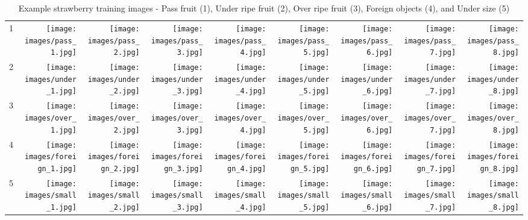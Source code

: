 \documentclass[fleqn,twoside,12pt]{report}
\begin{document}
\begin{table}[h]
	\centering
	\caption{Example strawberry training images - Pass fruit (1), Under ripe fruit (2), Over ripe fruit (3), Foreign objects (4), and Under size (5)}
	\label{tab:training_samples}
	\begin{tabular}{c*8{N}}
		
		1 &
		\texttt{[image: images/pass\_1.jpg]} & \texttt{[image: images/pass\_2.jpg]} & \texttt{[image: images/pass\_3.jpg]} &         \texttt{[image: images/pass\_4.jpg]} & \texttt{[image: images/pass\_5.jpg]} &         \texttt{[image: images/pass\_6.jpg]} & \texttt{[image: images/pass\_7.jpg]} &         \texttt{[image: images/pass\_8.jpg]} \\
		
		2 &
		\texttt{[image: images/under\_1.jpg]} & \texttt{[image: images/under\_2.jpg]} & \texttt{[image: images/under\_3.jpg]} &         \texttt{[image: images/under\_4.jpg]} & \texttt{[image: images/under\_5.jpg]} &         \texttt{[image: images/under\_6.jpg]} & \texttt{[image: images/under\_7.jpg]} &         \texttt{[image: images/under\_8.jpg]} \\
		
		3 &
		\texttt{[image: images/over\_1.jpg]} & \texttt{[image: images/over\_2.jpg]} & \texttt{[image: images/over\_3.jpg]} &         \texttt{[image: images/over\_4.jpg]} & \texttt{[image: images/over\_5.jpg]} &         \texttt{[image: images/over\_6.jpg]} & \texttt{[image: images/over\_7.jpg]} &         \texttt{[image: images/over\_8.jpg]} \\
		
		4 &
		\texttt{[image: images/foreign\_1.jpg]} & \texttt{[image: images/foreign\_2.jpg]} & \texttt{[image: images/foreign\_3.jpg]} &         \texttt{[image: images/foreign\_4.jpg]} & \texttt{[image: images/foreign\_5.jpg]} &         \texttt{[image: images/foreign\_6.jpg]} & \texttt{[image: images/foreign\_7.jpg]} &         \texttt{[image: images/foreign\_8.jpg]} \\
		
		5 &
		\texttt{[image: images/small\_1.jpg]} & \texttt{[image: images/small\_2.jpg]} & \texttt{[image: images/small\_3.jpg]} &         \texttt{[image: images/small\_4.jpg]} & \texttt{[image: images/small\_5.jpg]} &         \texttt{[image: images/small\_6.jpg]} & \texttt{[image: images/small\_7.jpg]} &         \texttt{[image: images/small\_8.jpg]} \\
		
	\end{tabular}
\end{table} 
\end{document}

